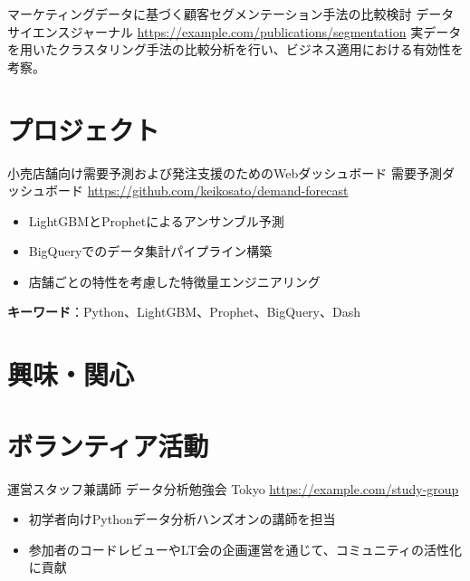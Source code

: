 \documentclass[a4paper, serif, 10pt]{moderncv}
\begin{document}
        {マーケティングデータに基づく顧客セグメンテーション手法の比較検討}
        {データサイエンスジャーナル}
        {\url{https://example.com/publications/segmentation}}
        {}
        {実データを用いたクラスタリング手法の比較分析を行い、ビジネス適用における有効性を考察。}
\section{プロジェクト}

        {小売店舗向け需要予測および発注支援のためのWebダッシュボード}
        {需要予測ダッシュボード}
        {\url{https://github.com/keikosato/demand-forecast}}
        {}
        {\begin{itemize}
\item LightGBMとProphetによるアンサンブル予測
\item BigQueryでのデータ集計パイプライン構築
\item 店舗ごとの特性を考慮した特徴量エンジニアリング
\end{itemize}
\textbf{キーワード}：Python、LightGBM、Prophet、BigQuery、Dash}
\section{興味・関心}

\section{ボランティア活動}

        {運営スタッフ兼講師}
        {データ分析勉強会 Tokyo}
        {\url{https://example.com/study-group}}
        {}
        {\begin{itemize}
\item 初学者向けPythonデータ分析ハンズオンの講師を担当
\item 参加者のコードレビューやLT会の企画運営を通じて、コミュニティの活性化に貢献
\end{itemize}}
    
\end{document}
